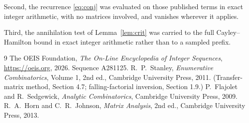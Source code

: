 \documentclass[11pt,a4paper]{article}
\theoremstyle{plain}
\theoremstyle{definition}
\begin{document}
Second, the recurrence \eqref{eq:conj} was evaluated on those published terms in exact
integer arithmetic, with no matrices involved, and vanishes wherever it applies.

Third, the annihilation test of Lemma~\ref{lem:crit} was carried to the full
Cayley--Hamilton bound in exact integer arithmetic rather than to a sampled prefix.

\begin{thebibliography}{9}
 The OEIS Foundation, \emph{The On-Line Encyclopedia of Integer
Sequences}, \url{https://oeis.org}, 2026. Sequence A281125.
 R.~P.~Stanley, \emph{Enumerative Combinatorics}, Volume 1, 2nd ed.,
Cambridge University Press, 2011. (Transfer-matrix method, Section 4.7; falling-factorial
inversion, Section 1.9.)
 P.~Flajolet and R.~Sedgewick, \emph{Analytic Combinatorics}, Cambridge
University Press, 2009.
 R.~A.~Horn and C.~R.~Johnson, \emph{Matrix Analysis}, 2nd ed., Cambridge
University Press, 2013.
\end{thebibliography}
\end{document}
